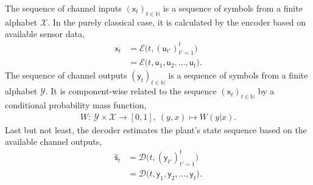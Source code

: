 \documentclass[conference]{IEEEtran}
\newcommand{\rx}{\mathsf{x}}
\newcommand{\ry}{\mathsf{y}}
\newcommand{\rs}{\mathsf{s}}
\newcommand{\ru}{\mathsf{u}}
\def\E{{\mathcal E}}
\def\D{{\mathcal D}}
\def\X{{\mathcal X}}
\def\Y{{\mathcal Y}}
\def\NN{{\mathbb N}}
\begin{document}
	The sequence of channel inputs \((\rx_t)_{t\in\NN}\) is a sequence
	of symbols from a finite alphabet \(\X\). In the purely classical case, it is calculated by the encoder based on available sensor data,
	\begin{align}	\rx_t   &= \E \big(t, (\ru_{t'})_{t'=1}^{t}\big) \nonumber\\
							&= \E\big(t, \ru_1,\ru_2,\ldots,\ru_t\big).
	\end{align} 
	The sequence of channel outputs \((\ry_t)_{t\in\NN}\) is a sequence
	of symbols from a finite alphabet \(\Y\). 
	It is component-wise related to the sequence \((\rx_t)_{t\in\NN}\) by a conditional probability mass function,
	\begin{align}   \label{eq:CndPrbMass}
					W :~ \Y \times \X \rightarrow [0,1],~(y,x) \mapsto W(y|x).
	\end{align}
	Last but not least, 
	the decoder estimates the plant's state sequence based on the available channel outputs,
	\begin{align}	\hat{\rs}_t  	&= \D \big(t, (\ry_{t'})_{t'=1}^{t}\big) \nonumber\\ 
									&= \D\big(t,\ry_1,\ry_2,\ldots,\ry_t\big).
	\end{align}
\end{document}

